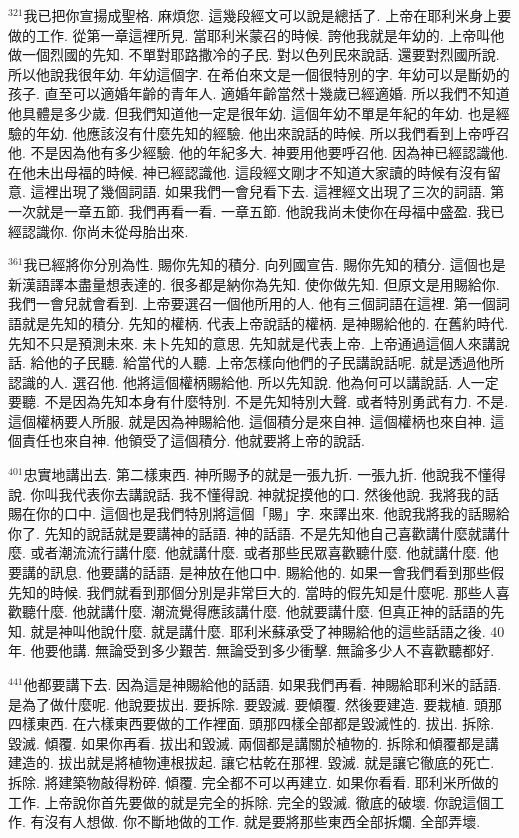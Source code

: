 \documentclass{book}
\begin{document}
$^{321}$我已把你宣揚成聖格.
麻煩您.
這幾段經文可以說是總括了.
上帝在耶利米身上要做的工作.
從第一章這裡所見.
當耶利米蒙召的時候.
誇他我就是年幼的.
上帝叫他做一個烈國的先知.
不單對耶路撒冷的子民.
對以色列民來說話.
還要對烈國所說.
所以他說我很年幼.
年幼這個字.
在希伯來文是一個很特別的字.
年幼可以是斷奶的孩子.
直至可以適婚年齡的青年人.
適婚年齡當然十幾歲已經適婚.
所以我們不知道他具體是多少歲.
但我們知道他一定是很年幼.
這個年幼不單是年紀的年幼.
也是經驗的年幼.
他應該沒有什麼先知的經驗.
他出來說話的時候.
所以我們看到上帝呼召他.
不是因為他有多少經驗.
他的年紀多大.
神要用他要呼召他.
因為神已經認識他.
在他未出母福的時候.
神已經認識他.
這段經文剛才不知道大家讀的時候有沒有留意.
這裡出現了幾個詞語.
如果我們一會兒看下去.
這裡經文出現了三次的詞語.
第一次就是一章五節.
我們再看一看.
一章五節.
他說我尚未使你在母福中盛盈.
我已經認識你.
你尚未從母胎出來.

$^{361}$我已經將你分別為性.
賜你先知的積分.
向列國宣告.
賜你先知的積分.
這個也是新漢語譯本盡量想表達的.
很多都是納你為先知.
使你做先知.
但原文是用賜給你.
我們一會兒就會看到.
上帝要選召一個他所用的人.
他有三個詞語在這裡.
第一個詞語就是先知的積分.
先知的權柄.
代表上帝說話的權柄.
是神賜給他的.
在舊約時代.
先知不只是預測未來.
未卜先知的意思.
先知就是代表上帝.
上帝通過這個人來講說話.
給他的子民聽.
給當代的人聽.
上帝怎樣向他們的子民講說話呢.
就是透過他所認識的人.
選召他.
他將這個權柄賜給他.
所以先知說.
他為何可以講說話.
人一定要聽.
不是因為先知本身有什麼特別.
不是先知特別大聲.
或者特別勇武有力.
不是.
這個權柄要人所服.
就是因為神賜給他.
這個積分是來自神.
這個權柄也來自神.
這個責任也來自神.
他領受了這個積分.
他就要將上帝的說話.

$^{401}$忠實地講出去.
第二樣東西.
神所賜予的就是一張九折.
一張九折.
他說我不懂得說.
你叫我代表你去講說話.
我不懂得說.
神就捉摸他的口.
然後他說.
我將我的話賜在你的口中.
這個也是我們特別將這個「賜」字.
來譯出來.
他說我將我的話賜給你了.
先知的說話就是要講神的話語.
神的話語.
不是先知他自己喜歡講什麼就講什麼.
或者潮流流行講什麼.
他就講什麼.
或者那些民眾喜歡聽什麼.
他就講什麼.
他要講的訊息.
他要講的話語.
是神放在他口中.
賜給他的.
如果一會我們看到那些假先知的時候.
我們就看到那個分別是非常巨大的.
當時的假先知是什麼呢.
那些人喜歡聽什麼.
他就講什麼.
潮流覺得應該講什麼.
他就要講什麼.
但真正神的話語的先知.
就是神叫他說什麼.
就是講什麼.
耶利米蘇承受了神賜給他的這些話語之後.
40年.
他要他講.
無論受到多少艱苦.
無論受到多少衝擊.
無論多少人不喜歡聽都好.

$^{441}$他都要講下去.
因為這是神賜給他的話語.
如果我們再看.
神賜給耶利米的話語.
是為了做什麼呢.
他說要拔出.
要拆除.
要毀滅.
要傾覆.
然後要建造.
要栽植.
頭那四樣東西.
在六樣東西要做的工作裡面.
頭那四樣全部都是毀滅性的.
拔出.
拆除.
毀滅.
傾覆.
如果你再看.
拔出和毀滅.
兩個都是講關於植物的.
拆除和傾覆都是講建造的.
拔出就是將植物連根拔起.
讓它枯乾在那裡.
毀滅.
就是讓它徹底的死亡.
拆除.
將建築物敲得粉碎.
傾覆.
完全都不可以再建立.
如果你看看.
耶利米所做的工作.
上帝說你首先要做的就是完全的拆除.
完全的毀滅.
徹底的破壞.
你說這個工作.
有沒有人想做.
你不斷地做的工作.
就是要將那些東西全部拆爛.
全部弄壞.
\end{document}
